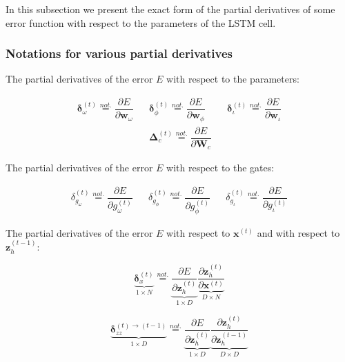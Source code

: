 \documentclass[11pt]{article}
\begin{document}
In this subsection we present the exact form of the partial
derivatives of some error function with respect to the parameters of
the LSTM cell.

\subsubsection*{Notations for various partial derivatives}


The partial derivatives of the error $E$ with respect to the parameters:

\begin{align}
     \boldsymbol{\delta}_{\omega}^{(t)} \overset{not.}{=}
     \dfrac{\partial E}{\partial \mathbf{w}_{\omega}}
  &&
     \boldsymbol{\delta}_{\phi}^{(t)} \overset{not.}{=}
     \dfrac{\partial E}{\partial \mathbf{w}_{\phi}}
  &&
     \boldsymbol{\delta}_{\iota}^{(t)} \overset{not.}{=}
     \dfrac{\partial E}{\partial \mathbf{w}_{\iota}} \\
  &&
     \boldsymbol{\Delta}_{c}^{(t)} \overset{not.}{=}
     \dfrac{\partial E}{\partial \mathbf{W}_{c}}
  &&
\end{align}

The partial derivatives of the error $E$ with respect to the gates:

\begin{align}
     \delta_{g_{\omega}}^{(t)} \overset{not.}{=}
     \dfrac{\partial E}{\partial g_{\omega}^{(t)}}
  &&
     \delta_{g_{\phi}}^{(t)} \overset{not.}{=}
     \dfrac{\partial E}{\partial g_{\phi}^{(t)}}
  &&
     \delta_{g_{\iota}}^{(t)} \overset{not.}{=}
     \dfrac{\partial E}{\partial g_{\iota}^{(t)}}
\end{align}


The partial derivatives of the error $E$ with respect to
$\mathbf{x}^{(t)}$ and with respect to $\mathbf{z}_h^{(t-1)}$:

\begin{equation}
    \underbrace{\boldsymbol{\delta}_{x}^{(t)}}_{1 \times N} \overset{not.}{=}
    \underbrace{\dfrac{\partial E}{\partial \mathbf{z}_h^{(t)}}}_{1 \times D}
    \underbrace{\dfrac{\partial \mathbf{z}_h^{(t)}}{\partial \mathbf{x}^{(t)}}}
    _{D \times N}
\end{equation}

\begin{equation}
  \underbrace{\boldsymbol{\delta}_{zz}^{(t)\rightarrow(t-1)}}_{1 \times D}
  \overset{not.}{=}
  \underbrace{\dfrac{\partial E}{\partial \mathbf{z}_h^{(t)}}}_{1 \times D}
  \underbrace{\dfrac{\partial \mathbf{z}_h^{(t)}}
    {\partial \mathbf{z}_h^{(t-1)}}}_{D \times D}
\end{equation}
\end{document}
